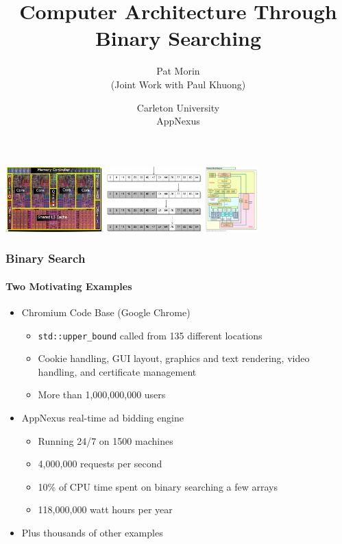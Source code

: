 \documentclass[xcolor=dvipsnames]{beamer}
\title{Computer Architecture Through Binary Searching}
\author{Pat Morin \\ (Joint Work with Paul Khuong)}
\date{Carleton University \\ AppNexus}
\begin{document}
\begin{frame}
  \titlepage
  \centerline{
    \includegraphics[height=1in]{images/nehalemdie}
    \includegraphics[height=1in]{images/binary-search}
    \includegraphics[height=1in]{images/nehalem-block}
  }
\end{frame}


\begin{frame}
  \frametitle{Binary Search}
  \framesubtitle{Two Motivating Examples}

  \begin{itemize}
    \item<+-> Chromium Code Base (Google Chrome)
    \begin{itemize}
       \item \texttt{std::upper_bound} called from 135 different locations
       \item Cookie handling, GUI layout, graphics and text rendering, video handling, and certificate management
       \item More than 1,000,000,000 users
    \end{itemize}
    \item<+->AppNexus real-time ad bidding engine
    \begin{itemize}
       \item Running 24/7 on 1500 machines
       \item 4,000,000 requests per second
       \item 10\% of CPU time spent on binary searching a few arrays
       \item 118,000,000 watt hours per year
    \end{itemize}
    \item<+->Plus thousands of other examples
  \end{itemize}
\end{frame}
\end{document}
